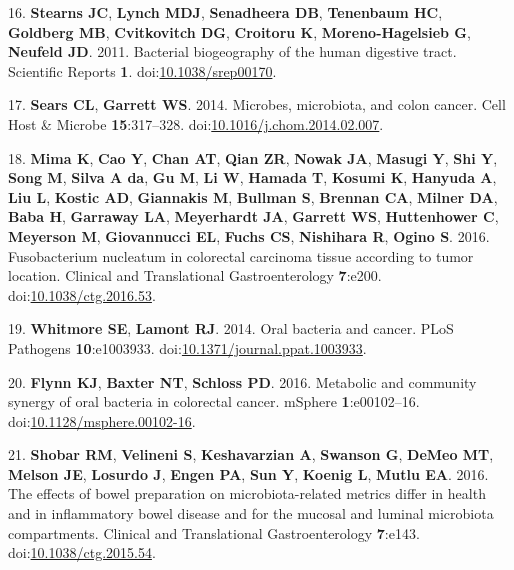 \documentclass[11pt,]{article}
\begin{document}
\hypertarget{ref-Stearns2011}{}
16. \textbf{Stearns JC}, \textbf{Lynch MDJ}, \textbf{Senadheera DB},
\textbf{Tenenbaum HC}, \textbf{Goldberg MB}, \textbf{Cvitkovitch DG},
\textbf{Croitoru K}, \textbf{Moreno-Hagelsieb G}, \textbf{Neufeld JD}.
2011. Bacterial biogeography of the human digestive tract. Scientific
Reports \textbf{1}.
doi:\href{https://doi.org/10.1038/srep00170}{10.1038/srep00170}.

\hypertarget{ref-Sears2014}{}
17. \textbf{Sears CL}, \textbf{Garrett WS}. 2014. Microbes, microbiota,
and colon cancer. Cell Host \& Microbe \textbf{15}:317--328.
doi:\href{https://doi.org/10.1016/j.chom.2014.02.007}{10.1016/j.chom.2014.02.007}.

\hypertarget{ref-Mima2016}{}
18. \textbf{Mima K}, \textbf{Cao Y}, \textbf{Chan AT}, \textbf{Qian ZR},
\textbf{Nowak JA}, \textbf{Masugi Y}, \textbf{Shi Y}, \textbf{Song M},
\textbf{Silva A da}, \textbf{Gu M}, \textbf{Li W}, \textbf{Hamada T},
\textbf{Kosumi K}, \textbf{Hanyuda A}, \textbf{Liu L}, \textbf{Kostic
AD}, \textbf{Giannakis M}, \textbf{Bullman S}, \textbf{Brennan CA},
\textbf{Milner DA}, \textbf{Baba H}, \textbf{Garraway LA},
\textbf{Meyerhardt JA}, \textbf{Garrett WS}, \textbf{Huttenhower C},
\textbf{Meyerson M}, \textbf{Giovannucci EL}, \textbf{Fuchs CS},
\textbf{Nishihara R}, \textbf{Ogino S}. 2016. Fusobacterium nucleatum in
colorectal carcinoma tissue according to tumor location. Clinical and
Translational Gastroenterology \textbf{7}:e200.
doi:\href{https://doi.org/10.1038/ctg.2016.53}{10.1038/ctg.2016.53}.

\hypertarget{ref-Whitmore2014}{}
19. \textbf{Whitmore SE}, \textbf{Lamont RJ}. 2014. Oral bacteria and
cancer. PLoS Pathogens \textbf{10}:e1003933.
doi:\href{https://doi.org/10.1371/journal.ppat.1003933}{10.1371/journal.ppat.1003933}.

\hypertarget{ref-Flynn2016}{}
20. \textbf{Flynn KJ}, \textbf{Baxter NT}, \textbf{Schloss PD}. 2016.
Metabolic and community synergy of oral bacteria in colorectal cancer.
mSphere \textbf{1}:e00102--16.
doi:\href{https://doi.org/10.1128/msphere.00102-16}{10.1128/msphere.00102-16}.

\hypertarget{ref-Shobar2016}{}
21. \textbf{Shobar RM}, \textbf{Velineni S}, \textbf{Keshavarzian A},
\textbf{Swanson G}, \textbf{DeMeo MT}, \textbf{Melson JE},
\textbf{Losurdo J}, \textbf{Engen PA}, \textbf{Sun Y}, \textbf{Koenig
L}, \textbf{Mutlu EA}. 2016. The effects of bowel preparation on
microbiota-related metrics differ in health and in inflammatory bowel
disease and for the mucosal and luminal microbiota compartments.
Clinical and Translational Gastroenterology \textbf{7}:e143.
doi:\href{https://doi.org/10.1038/ctg.2015.54}{10.1038/ctg.2015.54}.
\end{document}
